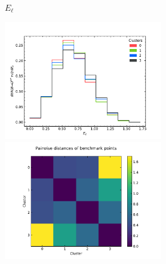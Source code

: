 \begin{frame}{$E_\ell$}
	\begin{changemargin}{-1cm}{-1cm}
		\begin{center}
			{\includegraphics[height=5.2cm, clip, trim=0cm 0cm 1.2cm 1cm]{figures/from-paper/El_tanbeta_dist3}}
			{\includegraphics[height=5.2cm, clip, trim=2.3cm 0cm 2cm 0cm]{figures/from-paper/El_tanbeta_dist3_bpoint_distances}}
		\end{center}
	\end{changemargin}
\end{frame}